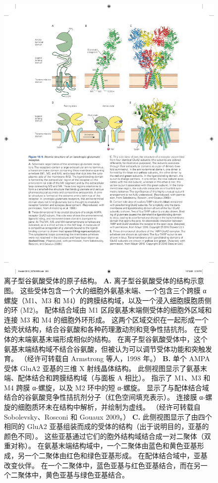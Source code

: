 \begin{figure}[htbp]
	\centering
	\includegraphics[width=0.8\linewidth]{chap13/fig_13_5}
	\caption{离子型谷氨酸受体的原子结构。
		\textbf{A.} 离子型谷氨酸受体的结构示意图。 
		这些受体包含一个大的细胞外氨基末端、一个包含三个跨膜 α 螺旋（M1、M3 和 M4）的跨膜结构域，以及一个浸入细胞膜胞质侧的环 (M2)。
		配体结合域由 M1 区段氨基末端侧受体的细胞外区域和连接 M3 和 M4 的细胞外环形成。
		这两个区域交织在一起形成一个蛤壳状结构，结合谷氨酸和各种药理激动剂和竞争性拮抗剂。
		在受体的末端氨基末端形成相似的结构。
		在离子型谷氨酸受体中，这个氨基末端结构域不结合谷氨酸，但被认为可以调节受体功能和突触发育。
		（经许可转载自 Armstrong 等人，1998 年。）
		\textbf{B.} 单个 AMPA 受体 GluA2 亚基的三维 X 射线晶体结构。
		此侧视图显示了氨基末端、配体结合和跨膜结构域（与面板 A 相比）。
		指示了 M1、M3 和 M4 跨膜 α-螺旋，以及 M2 环中的短 α-螺旋。
		显示了与配体结合域结合的谷氨酸竞争性拮抗剂分子（红色空间填充表示）。
		连接膜 α-螺旋的细胞质环未在结构中解析，并绘制为虚线。
		（经许可转载自 Sobolevsky、Rosconi 和 Gouaux 2009。）
		\textbf{C.} 此侧视图显示了由四个相同的 GluA2 亚基组装而成的受体的结构（出于说明目的，亚基的颜色不同）。
		这些亚基通过它们的胞外结构域结合成一对二聚体（双重对称）。
		在氨基末端结构域中，一个二聚体由蓝色和黄色亚基形成，另一个二聚体由红色和绿色亚基形成。
		在配体结合域中，亚基改变伙伴。
		在一个二聚体中，蓝色亚基与红色亚基结合，而在另一个二聚体中，黄色亚基与绿色亚基结合。
}
\end{figure}

